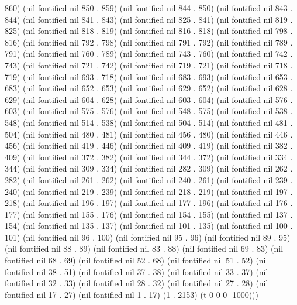 860) (nil fontified nil 850 . 859) (nil fontified nil 844 . 850) (nil fontified nil 843 . 844) (nil fontified nil 841 . 843) (nil fontified nil 825 . 841) (nil fontified nil 819 . 825) (nil fontified nil 818 . 819) (nil fontified nil 816 . 818) (nil fontified nil 798 . 816) (nil fontified nil 792 . 798) (nil fontified nil 791 . 792) (nil fontified nil 789 . 791) (nil fontified nil 760 . 789) (nil fontified nil 743 . 760) (nil fontified nil 742 . 743) (nil fontified nil 721 . 742) (nil fontified nil 719 . 721) (nil fontified nil 718 . 719) (nil fontified nil 693 . 718) (nil fontified nil 683 . 693) (nil fontified nil 653 . 683) (nil fontified nil 652 . 653) (nil fontified nil 629 . 652) (nil fontified nil 628 . 629) (nil fontified nil 604 . 628) (nil fontified nil 603 . 604) (nil fontified nil 576 . 603) (nil fontified nil 575 . 576) (nil fontified nil 548 . 575) (nil fontified nil 538 . 548) (nil fontified nil 514 . 538) (nil fontified nil 504 . 514) (nil fontified nil 481 . 504) (nil fontified nil 480 . 481) (nil fontified nil 456 . 480) (nil fontified nil 446 . 456) (nil fontified nil 419 . 446) (nil fontified nil 409 . 419) (nil fontified nil 382 . 409) (nil fontified nil 372 . 382) (nil fontified nil 344 . 372) (nil fontified nil 334 . 344) (nil fontified nil 309 . 334) (nil fontified nil 282 . 309) (nil fontified nil 262 . 282) (nil fontified nil 261 . 262) (nil fontified nil 240 . 261) (nil fontified nil 239 . 240) (nil fontified nil 219 . 239) (nil fontified nil 218 . 219) (nil fontified nil 197 . 218) (nil fontified nil 196 . 197) (nil fontified nil 177 . 196) (nil fontified nil 176 . 177) (nil fontified nil 155 . 176) (nil fontified nil 154 . 155) (nil fontified nil 137 . 154) (nil fontified nil 135 . 137) (nil fontified nil 101 . 135) (nil fontified nil 100 . 101) (nil fontified nil 96 . 100) (nil fontified nil 95 . 96) (nil fontified nil 89 . 95) (nil fontified nil 88 . 89) (nil fontified nil 83 . 88) (nil fontified nil 69 . 83) (nil fontified nil 68 . 69) (nil fontified nil 52 . 68) (nil fontified nil 51 . 52) (nil fontified nil 38 . 51) (nil fontified nil 37 . 38) (nil fontified nil 33 . 37) (nil fontified nil 32 . 33) (nil fontified nil 28 . 32) (nil fontified nil 27 . 28) (nil fontified nil 17 . 27) (nil fontified nil 1 . 17) (1 . 2153) (t 0 0 0 -1000)))

